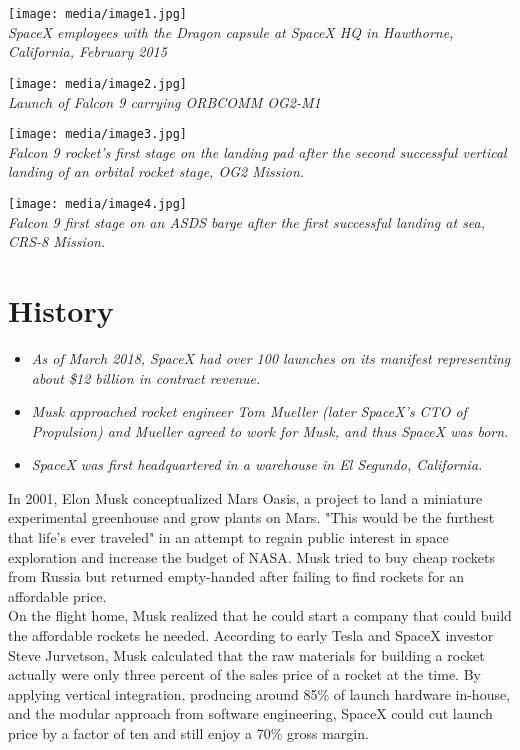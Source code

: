 \texttt{[image: media/image1.jpg]}\\
\emph{SpaceX employees with the Dragon capsule at SpaceX HQ in
Hawthorne, California, February 2015}

\texttt{[image: media/image2.jpg]}\\
\emph{Launch of Falcon 9 carrying ORBCOMM OG2-M1}

\texttt{[image: media/image3.jpg]}\\
\emph{Falcon 9 rocket's first stage on the landing pad after the second
successful vertical landing of an orbital rocket stage, OG2 Mission.}

\texttt{[image: media/image4.jpg]}\\
\emph{Falcon 9 first stage on an ASDS barge after the first successful
landing at sea, CRS-8 Mission.}

\section{History}\label{history}

\begin{itemize}
\item
  \emph{As of March 2018, SpaceX had over 100 launches on its manifest
  representing about \$12 billion in contract revenue.}
\item
  \emph{Musk approached rocket engineer Tom Mueller (later SpaceX's CTO
  of Propulsion) and Mueller agreed to work for Musk, and thus SpaceX
  was born.}
\item
  \emph{SpaceX was first headquartered in a warehouse in El Segundo,
  California.}
\end{itemize}

In 2001, Elon Musk conceptualized Mars Oasis, a project to land a
miniature experimental greenhouse and grow plants on Mars. "This would
be the furthest that life's ever traveled" in an attempt to regain
public interest in space exploration and increase the budget of NASA.
Musk tried to buy cheap rockets from Russia but returned empty-handed
after failing to find rockets for an affordable price.\\
On the flight home, Musk realized that he could start a company that
could build the affordable rockets he needed. According to early Tesla
and SpaceX investor Steve Jurvetson, Musk calculated that the raw
materials for building a rocket actually were only three percent of the
sales price of a rocket at the time. By applying vertical integration,
producing around 85\% of launch hardware in-house, and the modular
approach from software engineering, SpaceX could cut launch price by a
factor of ten and still enjoy a 70\% gross margin.

